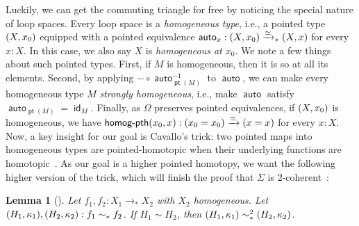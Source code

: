 \documentclass[10pt,a4paper]{article}
\newtheorem{lem}[thm]{Lemma}
\theoremstyle{definition}
\theoremstyle{remark}
\newcommand{\0}{\mathbf{0}}
\newcommand{\1}{\mathbf{1}}
\newcommand{\2}{\mathbf{2}}
\DeclareMathOperator{\auto}{\mathsf{auto}}
\DeclareMathOperator{\homogpth}{\textsf{homog-pth}}
\DeclareMathOperator{\idd}{\mathsf{id}}
\DeclareMathOperator{\pt}{\mathsf{pt}}
\newcommand{\myhref}[2]{%
  \href{#1}{\textcolor{blue!30!black}{#2}}%
}
\begin{document}
Luckily, we can get the commuting triangle for free by noticing the special nature of loop spaces. Every loop space is a \emph{homogeneous type}, i.e., a pointed type $\mleft(X, x_0\mright)$ equipped with a pointed equivalence $\auto_x : \mleft(X, x_0\mright) \xrightarrow{\simeq}_{\ast} \mleft(X, x\mright)$ for every $x : X$. In this case, we also say $X$ is \emph{homogeneous at $x_0$}. We note a few things about such pointed types. First, if $M$ is homogeneous, then it is so at all its elements. Second, by applying ${-} \circ \auto_{\pt(M)}^{-1}$ to $\auto$, we can make every homogeneous type $M$ \emph{strongly homogeneous}, i.e., make $\auto$ satisfy $\auto_{\pt(M)} = \idd_M$. Finally, as $\Omega$ preserves pointed equivalences, if $\mleft(X, x_0\mright)$ is homogeneous, we have $\homogpth(x_0, x) : \mleft(x_0 = x_0\mright) \xrightarrow{\simeq} \mleft(x = x\mright)$ for every $x : X$. 
Now, a key insight for our goal is Cavallo's trick: two pointed maps into homogeneous types are pointed-homotopic when their underlying functions are homotopic~\cite[\myhref{https://github.com/agda/cubical/blob/master/Cubical/Foundations/Pointed/Homogeneous.agda\#L41}{$\mathtt{\rightarrow \! \! \cdot Homogeneous \! \! \equiv}$}]{cubical}.
As our goal is a higher pointed homotopy, we want the following higher version of the trick, which will finish the proof that $\Sigma$ is $2$-coherent~\cite[\myhref{https://github.com/PHart3/colimits-agda/blob/lapc-lmcs/HoTT-Agda/theorems/homotopy/Suspension/Susp-2coher.agda}{Susp-2coher}]{2cohagda-pub}:
\begin{lem}[{\cite[\myhref{https://github.com/PHart3/colimits-agda/blob/lapc-lmcs/HoTT-Agda/core/lib/types/Homogeneous.agda\#L151}{\text{$\sim \!\! \odot$homog$\sim$}}]{2cohagda-pub}}] \label{trick}
  Let $f_1, f_2 : X_1 \to_{\ast} X_2$ with $X_2$ homogeneous. Let $\mleft(H_1, \kappa_1\mright), \mleft(H_2, \kappa_2\mright) : f_1 \sim_{\ast} f_2$. If $H_1 \sim H_2$, then $\mleft(H_1, \kappa_1\mright) \sim_{\ast}^2 \mleft(H_2, \kappa_2\mright)$.
\end{lem}
\end{document}
